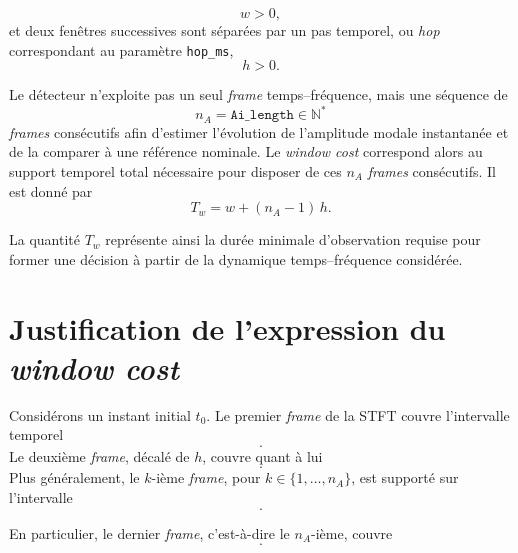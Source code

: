 \documentclass[12pt,a4paper, openany]{book}
\begin{document}
\begin{equation}
w > 0,
\end{equation}
et deux fenêtres successives sont séparées par un pas temporel, ou \textit{hop} correspondant au paramètre \texttt{hop\_ms},
\begin{equation}
h > 0.
\end{equation}

Le détecteur n'exploite pas un seul \textit{frame} temps--fréquence, mais une séquence de
\begin{equation}
n_A = \texttt{Ai\_length} \in \mathbb{N}^{*}
\end{equation}
\textit{frames} consécutifs afin d'estimer l'évolution de l'amplitude modale instantanée et de la comparer à une référence nominale. Le \textit{window cost} correspond alors au support temporel total nécessaire pour disposer de ces $n_A$ \textit{frames} consécutifs. Il est donné par
\begin{equation}
T_w = w + (n_A-1)\,h.
\label{eq:sst_window_cost}
\end{equation}

La quantité $T_w$ représente ainsi la durée minimale d'observation requise pour former une décision à partir de la dynamique temps--fréquence considérée.

\section{Justification de l'expression du \textit{window cost}}

Considérons un instant initial $t_0$. Le premier \textit{frame} de la STFT couvre l'intervalle temporel
\begin{equation}
[t_0,\; t_0 + w].
\end{equation}
Le deuxième \textit{frame}, décalé de $h$, couvre quant à lui
\begin{equation}
[t_0 + h,\; t_0 + h + w].
\end{equation}
Plus généralement, le $k$-ième \textit{frame}, pour $k \in \{1,\dots,n_A\}$, est supporté sur l'intervalle
\begin{equation}
[t_0 + (k-1)h,\; t_0 + (k-1)h + w].
\label{eq:frame_support_sst}
\end{equation}

En particulier, le dernier \textit{frame}, c'est-à-dire le $n_A$-ième, couvre
\begin{equation}
[t_0 + (n_A-1)h,\; t_0 + (n_A-1)h + w].
\end{equation}
\end{document}
